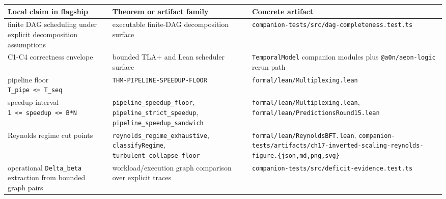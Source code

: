 \documentclass[
  11pt,
]{article}
\newcounter{none} %
\begin{document}
{\def\LTcaptype{none} %
\begin{longtable}[]{@{}
  >{\raggedright\arraybackslash}p{}
  >{\raggedright\arraybackslash}p{}
  >{\raggedright\arraybackslash}p{}@{}}
\toprule\noalign{}
\begin{minipage}[b]{\linewidth}\raggedright
Local claim in flagship
\end{minipage} & \begin{minipage}[b]{\linewidth}\raggedright
Theorem or artifact family
\end{minipage} & \begin{minipage}[b]{\linewidth}\raggedright
Concrete artifact
\end{minipage} \\
\midrule\noalign{}
\endhead
\bottomrule\noalign{}
\endlastfoot
finite DAG scheduling under explicit decomposition assumptions &
executable finite-DAG decomposition surface &
\texttt{companion-\allowbreak{}tests/\allowbreak{}src/\allowbreak{}dag-\allowbreak{}completeness.\allowbreak{}test.\allowbreak{}ts} \\
C1-C4 correctness envelope & bounded TLA+ and Lean scheduler surface &
\texttt{TemporalModel} companion modules plus \texttt{@a0n/aeon-logic}
rerun path \\
pipeline floor \texttt{T\_pipe\ \textless{}=\ T\_seq} &
\texttt{THM-PIPELINE-SPEEDUP-FLOOR} &
\texttt{formal/lean/Multiplexing.lean} \\
speedup interval \texttt{1\ \textless{}=\ speedup\ \textless{}=\ B*N} &
\texttt{pipeline\_speedup\_floor}, \texttt{pipeline\_strict\_speedup},
\texttt{pipeline\_speedup\_sandwich} &
\texttt{formal/lean/Multiplexing.lean},
\texttt{formal/lean/PredictionsRound15.lean} \\
Reynolds regime cut points & \texttt{reynolds\_regime\_exhaustive},
\texttt{classifyRegime}, \texttt{turbulent\_collapse\_floor} &
\texttt{formal/lean/ReynoldsBFT.lean},
\texttt{companion-\allowbreak{}tests/\allowbreak{}artifacts/\allowbreak{}ch17-\allowbreak{}inverted-\allowbreak{}scaling-\allowbreak{}reynolds-\allowbreak{}figure.\allowbreak{}\{json,md,png,svg\}} \\
operational \texttt{Delta\_beta} extraction from bounded graph pairs &
workload/execution graph comparison over explicit traces &
\texttt{companion-\allowbreak{}tests/\allowbreak{}src/\allowbreak{}deficit-\allowbreak{}evidence.\allowbreak{}test.\allowbreak{}ts} \\

\end{longtable}}
\end{document}
